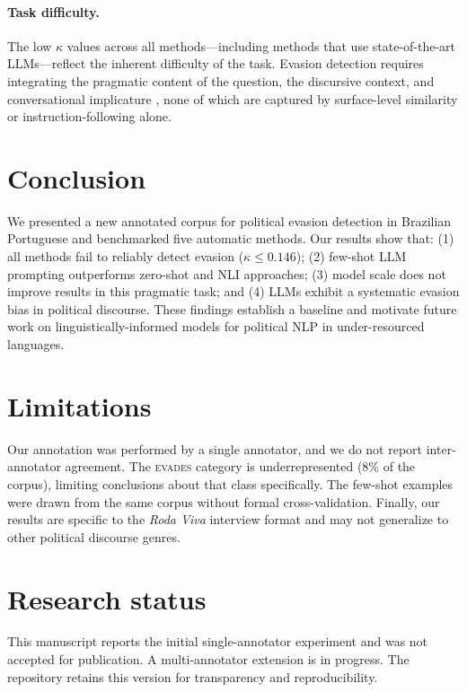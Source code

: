 \documentclass[11pt]{article}
\begin{document}
\paragraph{Task difficulty.}
The low $\kappa$ values across all methods---including methods that use state-of-the-art LLMs---reflect the inherent difficulty of the task. Evasion detection requires integrating the pragmatic content of the question, the discursive context, and conversational implicature \cite{grice1975logic}, none of which are captured by surface-level similarity or instruction-following alone.

\section{Conclusion}

We presented a new annotated corpus for political evasion detection in Brazilian Portuguese and benchmarked five automatic methods. Our results show that: (1) all methods fail to reliably detect evasion ($\kappa \leq 0.146$); (2) few-shot LLM prompting outperforms zero-shot and NLI approaches; (3) model scale does not improve results in this pragmatic task; and (4) LLMs exhibit a systematic evasion bias in political discourse. These findings establish a baseline and motivate future work on linguistically-informed models for political NLP in under-resourced languages.

\section*{Limitations}

Our annotation was performed by a single annotator, and we do not report inter-annotator agreement. The \textsc{evades} category is underrepresented (8\% of the corpus), limiting conclusions about that class specifically. The few-shot examples were drawn from the same corpus without formal cross-validation. Finally, our results are specific to the \textit{Roda Viva} interview format and may not generalize to other political discourse genres.

\section*{Research status}

This manuscript reports the initial single-annotator experiment and was not
accepted for publication. A multi-annotator extension is in progress. The
repository retains this version for transparency and reproducibility.



\end{document}
